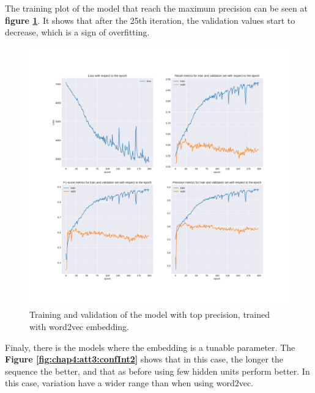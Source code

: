 The training plot of the model that reach the maximum precision can be seen at \textbf{figure \ref{fig:chap4:att1:train}}. It shows that after the 25th iteration, the validation values start to decrease, which is a sign of overfitting. \\

\begin{figure}
	\centering
	\includegraphics[width=\textwidth]{images/chapitre4/attention1}
	\caption{Training and validation of the model with top precision, trained with word2vec embedding.}
	\label{fig:chap4:att1:train}
\end{figure}

Finaly, there is the models where the embedding is a tunable parameter. The \textbf{Figure \ref{fig:chap4:att3:confInt2}} shows that in this case, the longer the sequence the better, and that as before using few hidden units perform better. In this case, variation have a wider range than when using word2vec. 


